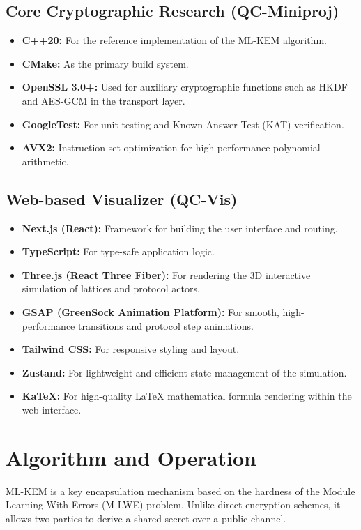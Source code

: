 \documentclass[12pt,a4paper]{article}
\begin{document}
\subsection{Core Cryptographic Research (QC-Miniproj)}
\begin{itemize}
    \item \textbf{C++20:} For the reference implementation of the ML-KEM algorithm.
    \item \textbf{CMake:} As the primary build system.
    \item \textbf{OpenSSL 3.0+:} Used for auxiliary cryptographic functions such as HKDF and AES-GCM in the transport layer.
    \item \textbf{GoogleTest:} For unit testing and Known Answer Test (KAT) verification.
    \item \textbf{AVX2:} Instruction set optimization for high-performance polynomial arithmetic.
\end{itemize}

\subsection{Web-based Visualizer (QC-Vis)}
\begin{itemize}
    \item \textbf{Next.js (React):} Framework for building the user interface and routing.
    \item \textbf{TypeScript:} For type-safe application logic.
    \item \textbf{Three.js (React Three Fiber):} For rendering the 3D interactive simulation of lattices and protocol actors.
    \item \textbf{GSAP (GreenSock Animation Platform):} For smooth, high-performance transitions and protocol step animations.
    \item \textbf{Tailwind CSS:} For responsive styling and layout.
    \item \textbf{Zustand:} For lightweight and efficient state management of the simulation.
    \item \textbf{KaTeX:} For high-quality LaTeX mathematical formula rendering within the web interface.
\end{itemize}

\section{Algorithm and Operation}
ML-KEM is a key encapsulation mechanism based on the hardness of the Module Learning With Errors (M-LWE) problem. Unlike direct encryption schemes, it allows two parties to derive a shared secret over a public channel.
\end{document}
